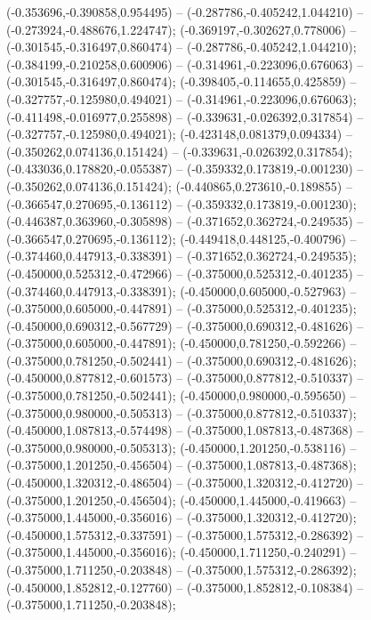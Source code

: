  (-0.353696,-0.390858,0.954495) -- (-0.287786,-0.405242,1.044210) -- (-0.273924,-0.488676,1.224747);
 (-0.369197,-0.302627,0.778006) -- (-0.301545,-0.316497,0.860474) -- (-0.287786,-0.405242,1.044210);
 (-0.384199,-0.210258,0.600906) -- (-0.314961,-0.223096,0.676063) -- (-0.301545,-0.316497,0.860474);
 (-0.398405,-0.114655,0.425859) -- (-0.327757,-0.125980,0.494021) -- (-0.314961,-0.223096,0.676063);
 (-0.411498,-0.016977,0.255898) -- (-0.339631,-0.026392,0.317854) -- (-0.327757,-0.125980,0.494021);
 (-0.423148,0.081379,0.094334) -- (-0.350262,0.074136,0.151424) -- (-0.339631,-0.026392,0.317854);
 (-0.433036,0.178820,-0.055387) -- (-0.359332,0.173819,-0.001230) -- (-0.350262,0.074136,0.151424);
 (-0.440865,0.273610,-0.189855) -- (-0.366547,0.270695,-0.136112) -- (-0.359332,0.173819,-0.001230);
 (-0.446387,0.363960,-0.305898) -- (-0.371652,0.362724,-0.249535) -- (-0.366547,0.270695,-0.136112);
 (-0.449418,0.448125,-0.400796) -- (-0.374460,0.447913,-0.338391) -- (-0.371652,0.362724,-0.249535);
 (-0.450000,0.525312,-0.472966) -- (-0.375000,0.525312,-0.401235) -- (-0.374460,0.447913,-0.338391);
 (-0.450000,0.605000,-0.527963) -- (-0.375000,0.605000,-0.447891) -- (-0.375000,0.525312,-0.401235);
 (-0.450000,0.690312,-0.567729) -- (-0.375000,0.690312,-0.481626) -- (-0.375000,0.605000,-0.447891);
 (-0.450000,0.781250,-0.592266) -- (-0.375000,0.781250,-0.502441) -- (-0.375000,0.690312,-0.481626);
 (-0.450000,0.877812,-0.601573) -- (-0.375000,0.877812,-0.510337) -- (-0.375000,0.781250,-0.502441);
 (-0.450000,0.980000,-0.595650) -- (-0.375000,0.980000,-0.505313) -- (-0.375000,0.877812,-0.510337);
 (-0.450000,1.087813,-0.574498) -- (-0.375000,1.087813,-0.487368) -- (-0.375000,0.980000,-0.505313);
 (-0.450000,1.201250,-0.538116) -- (-0.375000,1.201250,-0.456504) -- (-0.375000,1.087813,-0.487368);
 (-0.450000,1.320312,-0.486504) -- (-0.375000,1.320312,-0.412720) -- (-0.375000,1.201250,-0.456504);
 (-0.450000,1.445000,-0.419663) -- (-0.375000,1.445000,-0.356016) -- (-0.375000,1.320312,-0.412720);
 (-0.450000,1.575312,-0.337591) -- (-0.375000,1.575312,-0.286392) -- (-0.375000,1.445000,-0.356016);
 (-0.450000,1.711250,-0.240291) -- (-0.375000,1.711250,-0.203848) -- (-0.375000,1.575312,-0.286392);
 (-0.450000,1.852812,-0.127760) -- (-0.375000,1.852812,-0.108384) -- (-0.375000,1.711250,-0.203848);
